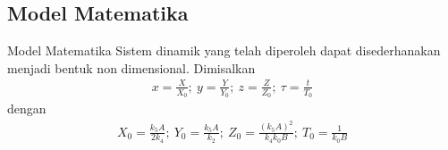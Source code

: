 \documentclass[aspectratio=169]{beamer}
\begin{document}

\subsection{Model Matematika}

\begin{frame}{Model Matematika}
    Sistem dinamik yang telah diperoleh dapat disederhanakan menjadi bentuk non dimensional. Dimisalkan
    \begin{align*}
        x = \frac{X}{X_0}; \ y = \frac{Y}{Y_0}; \ z= \frac{Z}{Z_0}; \ \tau = \frac{t}{T_0}
    \end{align*}
    dengan 
    \begin{align*}
        X_0 = \frac{k_5 A}{2k_4}; \ Y_0 = \frac{k_5 A}{k_2}; \ Z_0 = \frac{(k_5 A)^2}{k_4 k_0 B}; \ T_0 = \frac{1}{k_0 B}
    \end{align*}
\end{frame}

\end{document}
